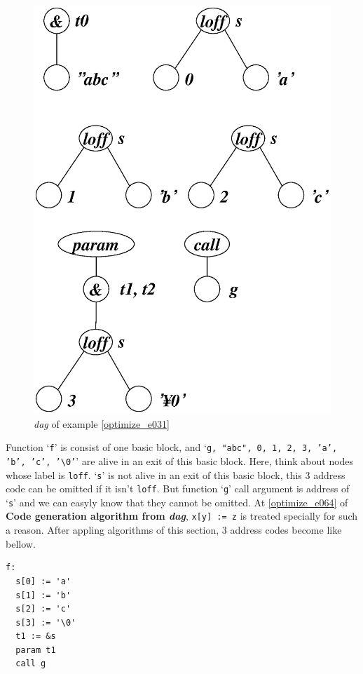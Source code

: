 \begin{Example}
\begin{figure}[htbp]
\begin{center}
\begin{latexonly}
\includegraphics[width=0.859\linewidth,height=1.0\linewidth]{opt016.eps}
\end{latexonly}
\caption{{\em dag} of example \ref{optimize_e031}}
\label{optimize_e032}
\end{center}
\end{figure}
Function `{\tt{f}}' is consist of one basic block, and 
`{\tt{g, "abc", 0, 1, 2, 3, 'a', 'b', 'c', '\verb|\|0'}}'
are alive in an exit of this basic block.
Here, think about nodes whose label is {\tt{loff}}.
`{\tt{s}}' is not alive in an exit of this basic block,
this 3 address code can be omitted if it isn't {\tt{loff}}.
But function `{\tt{g}}' call argument is address of `{\tt{s}}'
and we can easyly know that they cannot be omitted.
At \ref{optimize_e064} of {\bf Code generation algorithm from {\em dag}},
{\tt{x[y] := z}} is treated specially for such a reason.
After appling algorithms of this section,
3 address codes become like bellow.
\begin{verbatim}
f:
  s[0] := 'a'
  s[1] := 'b'
  s[2] := 'c'
  s[3] := '\0'
  t1 := &s
  param t1
  call g
\end{verbatim}
\end{Example}

